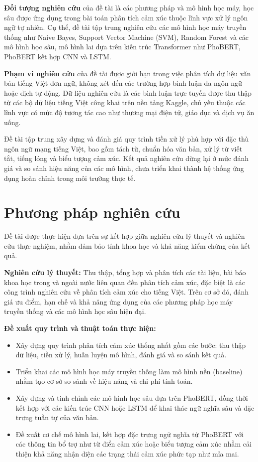 \documentclass[14pt, a4paper]{report}
\begin{document}
\textbf{Đối tượng nghiên cứu} của đề tài là các phương pháp và mô hình học máy, học sâu được ứng dụng trong bài toán phân tích cảm xúc thuộc lĩnh vực xử lý ngôn ngữ tự nhiên. Cụ thể, đề tài tập trung nghiên cứu các mô hình học máy truyền thống như Naive Bayes, Support Vector Machine (SVM), Random Forest và các mô hình học sâu, mô hình lai dựa trên kiến trúc Transformer như PhoBERT, PhoBERT kết hợp CNN và LSTM.

\textbf{Phạm vi nghiên cứu} của đề tài được giới hạn trong việc phân tích dữ liệu văn bản tiếng Việt đơn ngữ, không xét đến các trường hợp bình luận đa ngôn ngữ hoặc dịch tự động. Dữ liệu nghiên cứu là các bình luận trực tuyến được thu thập từ các bộ dữ liệu tiếng Việt công khai trên nền tảng Kaggle, chủ yếu thuộc các lĩnh vực có mức độ tương tác cao như thương mại điện tử, giáo dục và dịch vụ ăn uống.

Đề tài tập trung xây dựng và đánh giá quy trình tiền xử lý phù hợp với đặc thù ngôn ngữ mạng tiếng Việt, bao gồm tách từ, chuẩn hóa văn bản, xử lý từ viết tắt, tiếng lóng và biểu tượng cảm xúc. Kết quả nghiên cứu dừng lại ở mức đánh giá và so sánh hiệu năng của các mô hình, chưa triển khai thành hệ thống ứng dụng hoàn chỉnh trong môi trường thực tế.

\section{Phương pháp nghiên cứu}

Đề tài được thực hiện dựa trên sự kết hợp giữa nghiên cứu lý thuyết và nghiên cứu thực nghiệm, nhằm đảm bảo tính khoa học và khả năng kiểm chứng của kết quả.

\textbf{Nghiên cứu lý thuyết:} Thu thập, tổng hợp và phân tích các tài liệu, bài báo khoa học trong và ngoài nước liên quan đến phân tích cảm xúc, đặc biệt là các công trình nghiên cứu về phân tích cảm xúc cho tiếng Việt. Trên cơ sở đó, đánh giá ưu điểm, hạn chế và khả năng ứng dụng của các phương pháp học máy truyền thống và các mô hình học sâu hiện đại.

\textbf{Đề xuất quy trình và thuật toán thực hiện:}

\begin{itemize}
    \item Xây dựng quy trình phân tích cảm xúc thống nhất gồm các bước: thu thập dữ liệu, tiền xử lý, huấn luyện mô hình, đánh giá và so sánh kết quả.
    \item Triển khai các mô hình học máy truyền thống làm mô hình nền (baseline) nhằm tạo cơ sở so sánh về hiệu năng và chi phí tính toán.
    \item Xây dựng và tinh chỉnh các mô hình học sâu dựa trên PhoBERT, đồng thời kết hợp với các kiến trúc CNN hoặc LSTM để khai thác ngữ nghĩa sâu và đặc trưng tuần tự của văn bản.
    \item Đề xuất cơ chế mô hình lai, kết hợp đặc trưng ngữ nghĩa từ PhoBERT với các thông tin bổ trợ như từ điển cảm xúc hoặc biểu tượng cảm xúc nhằm cải thiện khả năng nhận diện các trạng thái cảm xúc phức tạp như mỉa mai.
\end{itemize}
\end{document}
